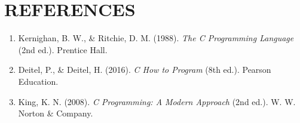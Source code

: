 \documentclass[12pt,a4paper]{article}
\begin{document}
\newpage
\section{REFERENCES}

\begin{enumerate}
  \item Kernighan, B. W., \& Ritchie, D. M. (1988). \textit{The C Programming Language} (2nd ed.). Prentice Hall.
  \item Deitel, P., \& Deitel, H. (2016). \textit{C How to Program} (8th ed.). Pearson Education.
  \item King, K. N. (2008). \textit{C Programming: A Modern Approach} (2nd ed.). W. W. Norton \& Company.
\end{enumerate}
\end{document}
